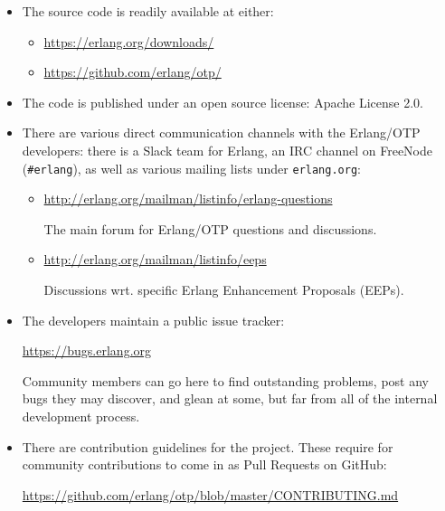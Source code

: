 \begin{itemize}

\item The source code is readily available at either:

\begin{itemize}

\item \url{https://erlang.org/downloads/}

\item \url{https://github.com/erlang/otp/}

\end{itemize}

\item The code is published under an open source license: Apache
License 2.0.

\item There are various direct communication channels with the
Erlang/OTP developers: there is a Slack team for Erlang, an IRC
channel on FreeNode (\texttt{\#erlang}), as well as various mailing
lists under \texttt{erlang.org}:

\begin{itemize}

\item \url{http://erlang.org/mailman/listinfo/erlang-questions}

The main forum for Erlang/OTP questions and discussions.

\item \url{http://erlang.org/mailman/listinfo/eeps}

Discussions wrt. specific Erlang Enhancement Proposals (EEPs).

\end{itemize}

\item The developers maintain a public issue tracker:

\url{https://bugs.erlang.org}

Community members can go here to find outstanding problems, post any
bugs they may discover, and glean at some, but far from all of the
internal development process.

\item There are contribution guidelines for the project. These require
for community contributions to come in as Pull Requests on GitHub:

\url{https://github.com/erlang/otp/blob/master/CONTRIBUTING.md}

\end{itemize}
